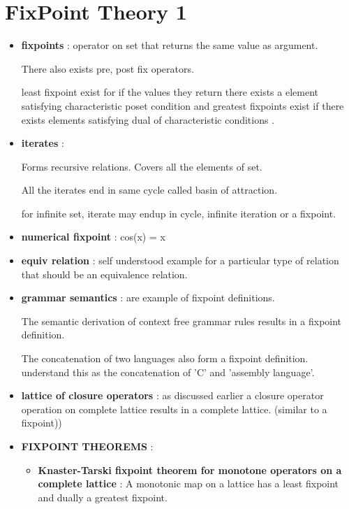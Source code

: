 \chapter{FixPoint Theory 1}

\begin{itemize}
	\item{\textbf{fixpoints} : 
	operator on set that returns the same value as argument.

	There also exists pre, post fix operators.

	least fixpoint exist for if the values they return there exists a element satisfying characteristic poset condition and  greatest fixpoints exist if there exists elements satisfying dual of characteristic conditions . 

	}

	\item{\textbf{iterates} :

	Forms recursive relations. Covers all the elements of set.

	All the iterates end in same cycle called basin of attraction.

	for infinite set, iterate may endup in cycle, infinite iteration or a fixpoint.

	}

	\item{\textbf{numerical fixpoint} : cos(x) = x
	}

	\item{\textbf{equiv relation} : self understood example for a particular type of relation that should be an equivalence relation.
	}
	
	\item{\textbf{grammar semantics} : are example of fixpoint definitions.

	The semantic derivation of context free grammar rules results in a fixpoint definition.

	The concatenation of two languages also form a fixpoint definition. understand this as the concatenation of 'C' and 'assembly language'. 
	}

	\item{\textbf{lattice of closure operators} :
	as discussed earlier a closure operator operation on complete lattice results in a complete lattice. (similar to a fixpoint)) 
	}

	\item{\textbf{FIXPOINT THEOREMS} :

	\begin{itemize}
		\item{\textbf{Knaster-Tarski fixpoint theorem for monotone operators on a complete lattice} :
		A monotonic map on a lattice has a least fixpoint and dually a greatest fixpoint.
		}


\end{itemize}}
\end{itemize}
